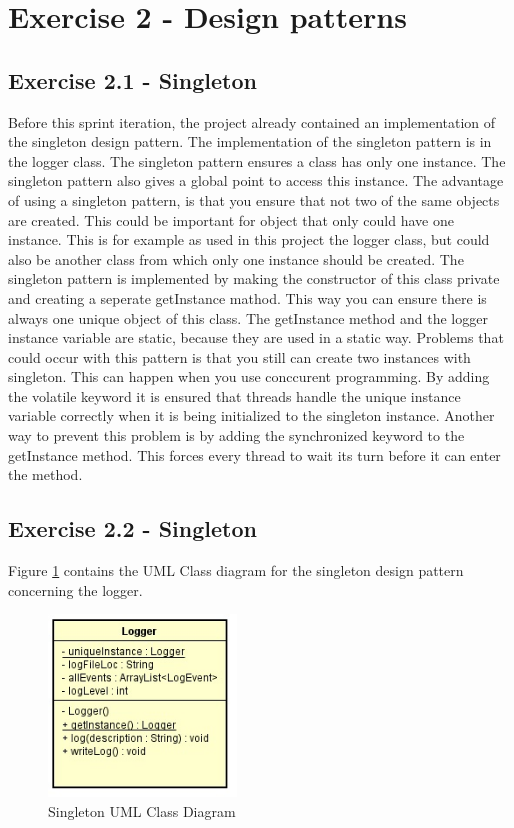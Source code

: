 \section{Exercise 2 - Design patterns }
\subsection{Exercise 2.1 - Singleton}
Before this sprint iteration, the project already contained an implementation of the singleton design pattern. The implementation of the singleton pattern is in the logger class. The singleton pattern ensures a class has only one instance. The singleton pattern also gives a global point to access this instance. The advantage of using a singleton pattern, is that you ensure that not two of the same objects are created. This could be important for object that only could have one instance. This is for example as used in this project the logger class, but could also be another class from which only one instance should be created.  The singleton pattern is implemented by making the constructor of this class private and creating a seperate getInstance mathod. This way you can ensure there is always one unique object of this class. The getInstance method and the logger instance variable are static, because they are used in a static way. Problems that could occur with this pattern is that you still can create two instances with singleton. This can happen when you use conccurent programming. By adding the volatile keyword it is ensured that threads handle the unique instance variable correctly when it is being initialized to the singleton instance.
Another way to prevent this problem is by adding the synchronized keyword to the getInstance method. This forces every thread to wait its turn before it can enter the method.

\subsection{Exercise 2.2 - Singleton}
Figure \ref{fig:2-2singleton} contains the UML Class diagram for the singleton design pattern concerning the logger.

\begin{figure}[ht!]
\centering
\includegraphics[width=5cm]{logger.jpg}
\caption{Singleton UML Class Diagram}
\label{fig:2-2singleton}
\end{figure}
\newpage

